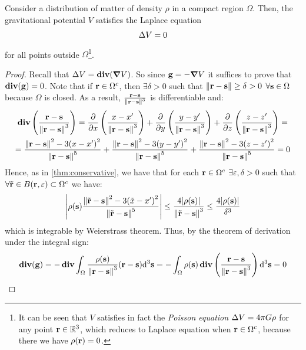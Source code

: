 \documentclass[../main.tex]{subfiles}
\begin{document}
\begin{theorem}
  Consider a distribution of matter of density $\rho$ in a compact region $\Omega$. Then, the gravitational potential $V$ satisfies the Laplace equation
  \begin{equation}
    \laplacian V = 0
  \end{equation}
  for all points outside $\Omega$\footnote{It can be seen that $V$ satisfies in fact the \emph{Poisson equation} $\laplacian V=4\pi G\rho$ for any point $\vf{r}\in\RR^3$, which reduces to Laplace equation when $\vf{r}\in\Omega^c$, because there we have $\rho(\vf{r})=0$.}.
\end{theorem}
\begin{proof}
  Recall that $\laplacian V=\div(\grad V)$. So since $\vf{g}=-\grad V$ it suffices to prove that $\div(\vf{g})=0$. Note that if $\vf{r}\in\Omega^c$, then $\exists \delta>0$ such that $\norm{\vf{r}-\vf{s}}\geq\delta>0$ $\forall \vf{s}\in\Omega$ because $\Omega$ is closed. As a result, $\frac{\vf{r}-\vf{s}}{\norm{\vf{r}-\vf{s}}^3}$ is differentiable and:
  \begin{multline*}
    \div\left(\frac{\vf{r}-\vf{s}}{\norm{\vf{r}-\vf{s}}^3}\right)=\pdv{}{x}\left(\frac{x-x'}{\norm{\vf{r}-\vf{s}}^3}\right)+\pdv{}{y}\left(\frac{y-y'}{\norm{\vf{r}-\vf{s}}^3}\right)+\pdv{}{z}\left(\frac{z-z'}{\norm{\vf{r}-\vf{s}}^3}\right)=\\
    =\frac{\norm{\vf{r}-\vf{s}}^2-3{(x-x')}^2}{\norm{\vf{r}-\vf{s}}^5}+\frac{\norm{\vf{r}-\vf{s}}^2-3{(y-y')}^2}{\norm{\vf{r}-\vf{s}}^5}+\frac{\norm{\vf{r}-\vf{s}}^2-3{(z-z')}^2}{\norm{\vf{r}-\vf{s}}^5} =0
  \end{multline*}
  Hence, as in \cref{thm:conservative}, we have that for each $\vf{r}\in\Omega^c$ $\exists\varepsilon,\delta>0$ such that $\forall \vf{\tilde{r}} \in B(\vf{r},\varepsilon)\subset\Omega^c$ we have:
  \begin{equation}
    \abs{\rho(\vf{s})\frac{\norm{\vf{\tilde{r}}-\vf{s}}^2-3{(\tilde{x}-x')}^2}{\norm{\vf{\tilde{r}}-\vf{s}}^5}}\leq \frac{4\abs{\rho(\vf{s})}}{\norm{\vf{\tilde{r}}-\vf{s}}^3}\leq \frac{4\abs{\rho(\vf{s})}}{\delta^3}
  \end{equation}
  which is integrable by Weierstrass theorem. Thus, by the theorem of derivation under the integral sign:
  \begin{equation}
    \div(\vf{g})=-\div\int_\Omega\frac{\rho(\vf{s})}{\norm{\vf{r}-\vf{s}}^3}(\vf{r}-\vf{s})\dd^3{\vf{s}}=-\int_\Omega\rho(\vf{s})\div\left(\frac{\vf{r}-\vf{s}}{\norm{\vf{r}-\vf{s}}^3}\right)\dd^3{\vf{s}}=0
  \end{equation}
\end{proof}
\end{document}
